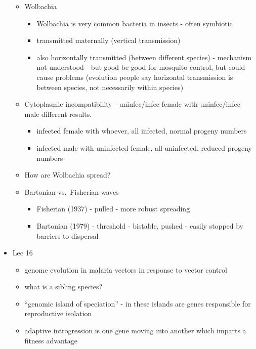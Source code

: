 \documentclass{article}
\begin{document}
\begin{itemize}
        \begin{itemize}
            \item Wolbachia
            \begin{itemize}
                \item Wolbachia is very common bacteria in insects - often symbiotic
                \item transmitted maternally (vertical transmission)
                \item also horizontally transmitted (between different species) - mechanism not understood - but good be good for mosquito control, but could cause problems (evolution people say horizontal transmission is between species, not necessarily within species)
            \end{itemize}
            \item Cytoplasmic incompatibility - uninfec/infec female with uninfec/infec male different results.
            \begin{itemize}
                \item infected female with whoever, all infected, normal progeny numbers
                \item infected male with uninfected female, all uninfected, reduced progeny numbers
            \end{itemize}
            \item How are Wolbachia spread?
            \item Bartonian vs.~Fisherian waves
            \begin{itemize}
                \item Fisherian (1937) - pulled - more robust spreading
                \item Bartonian (1979) - threshold - bistable, pushed - easily stopped by barriers to dispersal
            \end{itemize}
        \end{itemize}
        \item Lec 16
        \begin{itemize}
            \item genome evolution in malaria vectors in response to vector control
            \item what is a sibling species?
            \item ``genomic island of speciation'' - in these islands are genes responsible for reproductive isolation
            \item adaptive introgression is one gene moving into another which imparts a fitness advantage

\end{itemize}
\end{itemize}
\end{document}
